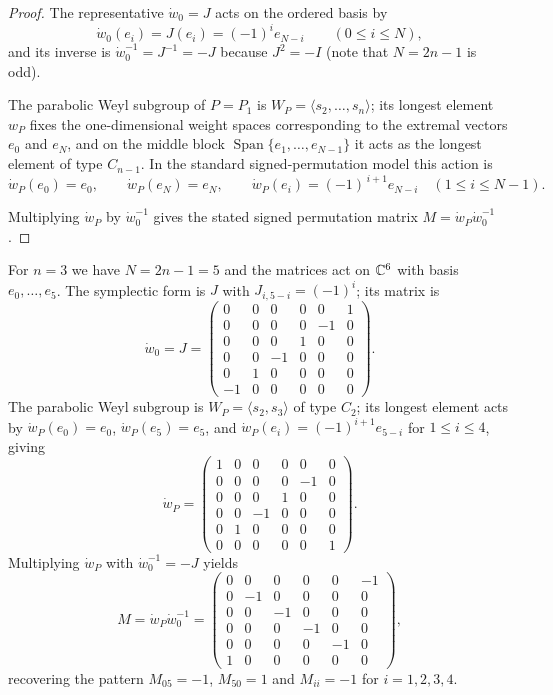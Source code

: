 \begin{proof}
The representative \(\dot w_0 = J\) acts on the ordered basis by
\[
\dot w_0(e_i)=J(e_i)=(-1)^i e_{N-i}\qquad(0\le i\le N),
\]
and its inverse is \(\dot w_0^{-1}=J^{-1}=-J\) because \(J^2=-I\) (note that \(N=2n-1\) is odd).

The parabolic Weyl subgroup of \(P=P_1\) is \(W_P=\langle s_2,\dots,s_n\rangle\); its longest element \(w_P\) fixes the one-dimensional weight spaces corresponding to the extremal vectors \(e_0\) and \(e_N\), and on the middle block \(\operatorname{Span}\{e_1,\dots,e_{N-1}\}\) it acts as the longest element of type \(C_{n-1}\).  In the standard signed-permutation model this action is
\[
\dot w_P(e_0)=e_0,\qquad
\dot w_P(e_N)=e_N,\qquad
\dot w_P(e_i)=(-1)^{\,i+1}e_{N-i}\quad(1\le i\le N-1).
\]

Multiplying \(\dot w_P\) by \(\dot w_0^{-1}\) gives the stated signed permutation matrix \(M=\dot w_P\dot w_0^{-1}\).
\end{proof}

\begin{exam}\label{ex:n3-matrices}
For \(n=3\) we have \(N=2n-1=5\) and the matrices act on \(\mathbb{C}^6\) with basis \(e_0,\dots,e_5\).
The symplectic form is \(J\) with \(J_{i,5-i}=(-1)^i\); its matrix is
\[
\dot w_0 = J =
\begin{pmatrix}
 0& 0& 0& 0& 0& 1\\
 0& 0& 0& 0&-1& 0\\
 0& 0& 0& 1& 0& 0\\
 0& 0&-1& 0& 0& 0\\
 0& 1& 0& 0& 0& 0\\
-1& 0& 0& 0& 0& 0
\end{pmatrix}.
\]
The parabolic Weyl subgroup is \(W_P=\langle s_2,s_3\rangle\) of type \(C_2\); its longest element acts by \(\dot w_P(e_0)=e_0\), \(\dot w_P(e_5)=e_5\), and \(\dot w_P(e_i)=(-1)^{i+1}e_{5-i}\) for \(1\le i\le 4\), giving
\[
\dot w_P =
\begin{pmatrix}
1& 0& 0& 0& 0& 0\\
0& 0& 0& 0&-1& 0\\
0& 0& 0& 1& 0& 0\\
0& 0&-1& 0& 0& 0\\
0& 1& 0& 0& 0& 0\\
0& 0& 0& 0& 0& 1
\end{pmatrix}.
\]
Multiplying \(\dot w_P\) with \(\dot w_0^{-1}=-J\) yields
\[
M = \dot w_P\dot w_0^{-1} =
\begin{pmatrix}
 0& 0& 0& 0& 0&-1\\
 0&-1& 0& 0& 0& 0\\
 0& 0&-1& 0& 0& 0\\
 0& 0& 0&-1& 0& 0\\
 0& 0& 0& 0&-1& 0\\
 1& 0& 0& 0& 0& 0
\end{pmatrix},
\]
recovering the pattern \(M_{05}=-1\), \(M_{50}=1\) and \(M_{ii}=-1\) for \(i=1,2,3,4\).
\end{exam}

